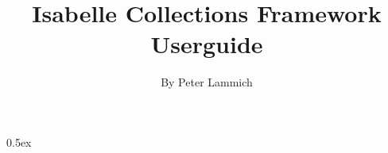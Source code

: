 \documentclass[11pt,a4paper]{article}
\begin{document}
\title{Isabelle Collections Framework Userguide}
\author{By Peter Lammich}
\maketitle

\clearpage

\tableofcontents

\clearpage

\parindent 0pt\parskip 0.5ex

\newcommand{\isaheader}[1]{#1}
\newcommand{\isachapter}[1]{\chapter{#1}}
\newcommand{\isasection}[1]{\section{#1}}

\renewcommand{\isamarkupchapter}[1]{\chapter{#1}}
\renewcommand{\isamarkupsection}[1]{\subsection{#1}}
\renewcommand{\isamarkupsubsection}[1]{\subsubsection{#1}}
\renewcommand{\isamarkupsubsubsection}[1]{\paragraph{#1}}





\end{document}

